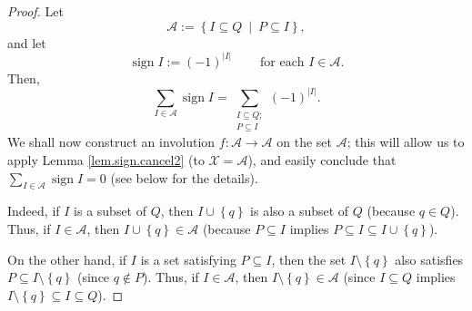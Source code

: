 \begin{proof}
Let
\[
\mathcal{A}:=\left\{  I\subseteq Q\ \mid\ P\subseteq I\right\}  ,
\]
and let
\[
\operatorname*{sign}I:=\left(  -1\right)  ^{\left\vert I\right\vert
}\ \ \ \ \ \ \ \ \ \ \text{for each }I\in\mathcal{A}.
\]
Then,%
\begin{equation}
\sum_{I\in\mathcal{A}}\operatorname*{sign}I=\sum_{\substack{I\subseteq
Q;\\P\subseteq I}}\left(  -1\right)  ^{\left\vert I\right\vert }.
\label{pf.lem.pie.two-sets-altsum.a.3}%
\end{equation}
We shall now construct an involution $f:\mathcal{A}\rightarrow\mathcal{A}$ on
the set $\mathcal{A}$; this will allow us to apply Lemma
\ref{lem.sign.cancel2} (to $\mathcal{X}=\mathcal{A}$), and easily conclude
that $\sum_{I\in\mathcal{A}}\operatorname*{sign}I=0$ (see below for the details).

Indeed, if $I$ is a subset of $Q$, then $I\cup\left\{  q\right\}  $ is also a
subset of $Q$ (because $q\in Q$). Thus, if $I\in\mathcal{A}$, then
$I\cup\left\{  q\right\}  \in\mathcal{A}$ (because $P\subseteq I$ implies
$P\subseteq I\subseteq I\cup\left\{  q\right\}  $).

On the other hand, if $I$ is a set satisfying $P\subseteq I$, then the set
$I\setminus\left\{  q\right\}  $ also satisfies $P\subseteq I\setminus\left\{
q\right\}  $ (since $q\notin P$). Thus, if $I\in\mathcal{A}$, then
$I\setminus\left\{  q\right\}  \in\mathcal{A}$ (since $I\subseteq Q$ implies
$I\setminus\left\{  q\right\}  \subseteq I\subseteq Q$).


\end{proof}
